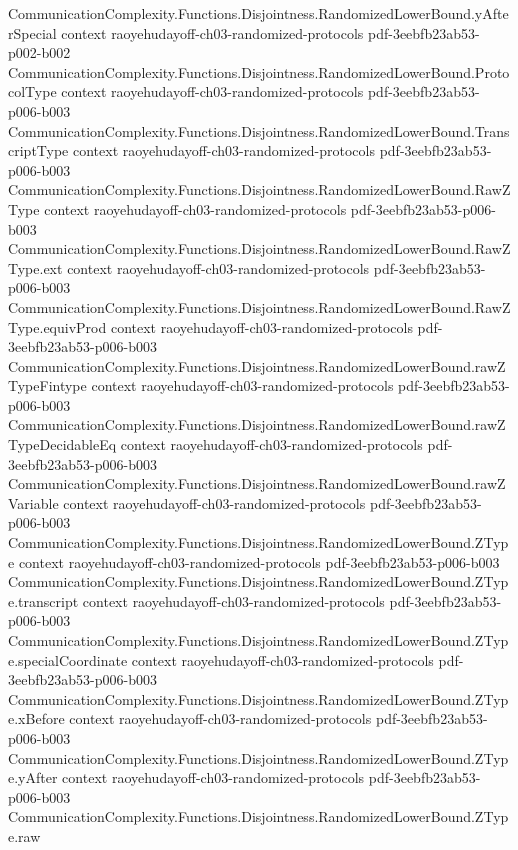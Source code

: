 \begin{theorem}
\proofstep
  {CommunicationComplexity.Functions.Disjointness.RandomizedLowerBound.yAfterSpecial}
  {context}
  {raoyehudayoff-ch03-randomized-protocols}
  {pdf-3eebfb23ab53-p002-b002}
\proofstep
  {CommunicationComplexity.Functions.Disjointness.RandomizedLowerBound.ProtocolType}
  {context}
  {raoyehudayoff-ch03-randomized-protocols}
  {pdf-3eebfb23ab53-p006-b003}
\proofstep
  {CommunicationComplexity.Functions.Disjointness.RandomizedLowerBound.TranscriptType}
  {context}
  {raoyehudayoff-ch03-randomized-protocols}
  {pdf-3eebfb23ab53-p006-b003}
\proofstep
  {CommunicationComplexity.Functions.Disjointness.RandomizedLowerBound.RawZType}
  {context}
  {raoyehudayoff-ch03-randomized-protocols}
  {pdf-3eebfb23ab53-p006-b003}
\proofstep
  {CommunicationComplexity.Functions.Disjointness.RandomizedLowerBound.RawZType.ext}
  {context}
  {raoyehudayoff-ch03-randomized-protocols}
  {pdf-3eebfb23ab53-p006-b003}
\proofstep
  {CommunicationComplexity.Functions.Disjointness.RandomizedLowerBound.RawZType.equivProd}
  {context}
  {raoyehudayoff-ch03-randomized-protocols}
  {pdf-3eebfb23ab53-p006-b003}
\proofstep
  {CommunicationComplexity.Functions.Disjointness.RandomizedLowerBound.rawZTypeFintype}
  {context}
  {raoyehudayoff-ch03-randomized-protocols}
  {pdf-3eebfb23ab53-p006-b003}
\proofstep
  {CommunicationComplexity.Functions.Disjointness.RandomizedLowerBound.rawZTypeDecidableEq}
  {context}
  {raoyehudayoff-ch03-randomized-protocols}
  {pdf-3eebfb23ab53-p006-b003}
\proofstep
  {CommunicationComplexity.Functions.Disjointness.RandomizedLowerBound.rawZVariable}
  {context}
  {raoyehudayoff-ch03-randomized-protocols}
  {pdf-3eebfb23ab53-p006-b003}
\proofstep
  {CommunicationComplexity.Functions.Disjointness.RandomizedLowerBound.ZType}
  {context}
  {raoyehudayoff-ch03-randomized-protocols}
  {pdf-3eebfb23ab53-p006-b003}
\proofstep
  {CommunicationComplexity.Functions.Disjointness.RandomizedLowerBound.ZType.transcript}
  {context}
  {raoyehudayoff-ch03-randomized-protocols}
  {pdf-3eebfb23ab53-p006-b003}
\proofstep
  {CommunicationComplexity.Functions.Disjointness.RandomizedLowerBound.ZType.specialCoordinate}
  {context}
  {raoyehudayoff-ch03-randomized-protocols}
  {pdf-3eebfb23ab53-p006-b003}
\proofstep
  {CommunicationComplexity.Functions.Disjointness.RandomizedLowerBound.ZType.xBefore}
  {context}
  {raoyehudayoff-ch03-randomized-protocols}
  {pdf-3eebfb23ab53-p006-b003}
\proofstep
  {CommunicationComplexity.Functions.Disjointness.RandomizedLowerBound.ZType.yAfter}
  {context}
  {raoyehudayoff-ch03-randomized-protocols}
  {pdf-3eebfb23ab53-p006-b003}
\proofstep
  {CommunicationComplexity.Functions.Disjointness.RandomizedLowerBound.ZType.raw}

\end{theorem}

